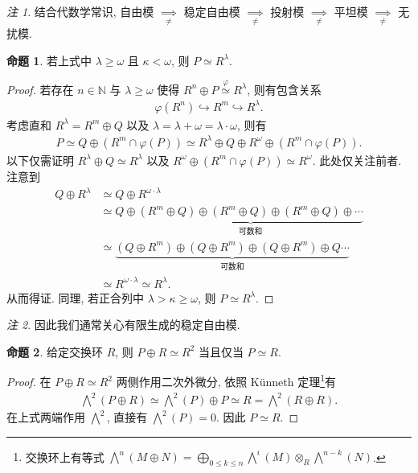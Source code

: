\documentclass{MainStyle}
\theoremstyle{definition}
\theoremstyle{definition}
\theoremstyle{definition}
\theoremstyle{definition}
\newtheorem{proposition}{命题}
\theoremstyle{definition}
\theoremstyle{definition}
\theoremstyle{definition}
\theoremstyle{remark}
\newtheorem{remark}{注}
\theoremstyle{remark}
\begin{document}
\begin{remark}
    结合代数学常识, 自由模 $\underset\neq\implies$ 稳定自由模 $\underset\neq\implies$ 投射模 $\underset\neq\implies$ 平坦模 $\underset\neq\implies$ 无扰模.
\end{remark}

\begin{proposition}
    若上式中 $\lambda\geq \omega$ 且 $\kappa<\omega$, 则 $P\simeq R^\lambda$.
    \begin{proof}
        若存在 $n\in \mathbb N$ 与 $\lambda\geq \omega$ 使得 $R^n\oplus P\overset\varphi \simeq R^\lambda$, 则有包含关系
        \begin{align*}
            \varphi(R^n)\hookrightarrow R^m\hookrightarrow R^\lambda.
        \end{align*}
        考虑直和 $R^\lambda = R^m\oplus Q$ 以及 $\lambda=\lambda+\omega=\lambda\cdot \omega$, 则有
        \begin{align*}
            P\simeq Q\oplus (R^m\cap \varphi(P))\simeq R^\lambda\oplus Q\oplus R^\omega \oplus (R^m\cap \varphi (P)).
        \end{align*}
        以下仅需证明 $R^\lambda\oplus Q\simeq R^\lambda$ 以及 $R^\omega\oplus (R^m\cap \varphi (P))\simeq R^\omega$. 此处仅关注前者. 注意到
        \begin{align*}
            Q\oplus R^\lambda & \simeq Q\oplus R^{\omega \cdot \lambda}                                                                               \\
                              & \simeq Q\oplus \underset{\text{可数和}}{\underbrace{(R^m\oplus Q)\oplus(R^m\oplus Q)\oplus(R^m\oplus Q)\oplus\cdots}} \\
                              & \simeq \underset{\text{可数和}}{\underbrace{( Q\oplus R^m)\oplus (Q\oplus R^m)\oplus (Q\oplus R^m)\oplus Q\cdots}}    \\
                              & \simeq R^{\omega\cdot \lambda}\simeq R^\lambda.
        \end{align*}
        从而得证. 同理, 若正合列中 $\lambda>\kappa\geq \omega$, 则 $P\simeq R^\lambda$.
    \end{proof}
\end{proposition}

\begin{remark}
    因此我们通常关心有限生成的稳定自由模.
\end{remark}

\begin{proposition}\label{PR=RR}
    给定交换环 $R$, 则 $P\oplus R\simeq R^2$ 当且仅当 $P\simeq R$.
    \begin{proof}
        在 $P\oplus R\simeq R^2$ 两侧作用二次外微分, 依照 Künneth 定理\footnote{交换环上有等式 $\bigwedge^n(M\oplus N)=\bigoplus_{0\leq k\leq n}\bigwedge^i(M)\otimes_R\bigwedge^{n-k}(N)$.}有
        \begin{align*}
            \bigwedge^2(P\oplus R)\simeq \bigwedge ^2(P)\oplus P\simeq R=\bigwedge^2(R\oplus R).
        \end{align*}
        在上式两端作用 $\bigwedge^2$, 直接有 $\bigwedge^2(P)=0$. 因此 $P\simeq R$.
    \end{proof}
\end{proposition}
\end{document}
